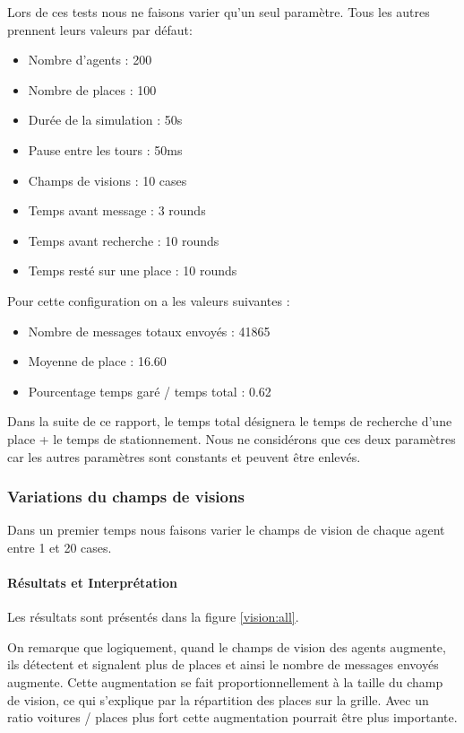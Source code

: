 Lors de ces tests nous ne faisons varier qu'un seul paramètre. Tous les autres prennent leurs valeurs par défaut:\\

\begin{itemize}
\item Nombre d'agents : 200
\item Nombre de places : 100
\item Durée de la simulation : 50s
\item Pause entre les tours : 50ms
\item Champs de visions : 10 cases
\item Temps avant message : 3 rounds
\item Temps avant recherche : 10 rounds
\item Temps resté sur une place : 10 rounds\\
\end{itemize}

Pour cette configuration on a les valeurs suivantes :\\

\begin{itemize}
\item Nombre de messages totaux envoyés : 41865
\item Moyenne de place :  16.60
\item Pourcentage temps garé / temps total : 0.62
\end{itemize}

Dans la suite de ce rapport, le temps total désignera le temps de recherche d'une place + le temps de stationnement. Nous ne considérons que ces deux paramètres car les autres paramètres sont constants et peuvent être enlevés.

\subsubsection{Variations du champs de visions}

Dans un premier temps nous faisons varier le champs de vision de chaque agent entre 1 et 20 cases.

\paragraph{Résultats et Interprétation}

Les résultats sont présentés dans la figure \ref{vision:all}.

On remarque que logiquement, quand le champs de vision des agents augmente, ils détectent et signalent plus de places et ainsi le nombre de messages envoyés augmente.
Cette augmentation se fait proportionnellement à la taille du champ de vision, ce qui s'explique par la répartition des places sur la grille. Avec un ratio voitures / places plus fort cette augmentation pourrait être plus importante.\\

